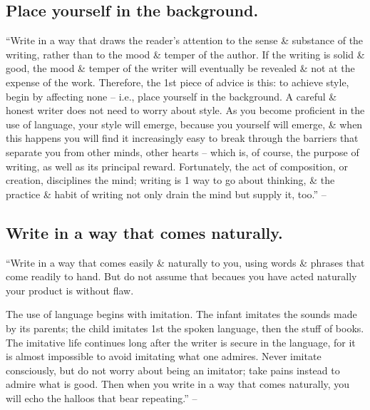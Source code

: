 \documentclass{article}
\numberwithin{equation}{section}
\begin{document}
\subsection{Place yourself in the background.}
``Write in a way that draws the reader's attention to the sense \& substance of the writing, rather than to the mood \& temper of the author. If the writing is solid \& good, the mood \& temper of the writer will eventually be revealed \& not at the expense of the work. Therefore, the 1st piece of advice is this: to achieve style, begin by affecting none -- i.e., place yourself in the background. A careful \& honest writer does not need to worry about style. As you become proficient in the use of language, your style will emerge, because you yourself will emerge, \& when this happens you will find it increasingly easy to break through the barriers that separate you from other minds, other hearts -- which is, of course, the purpose of writing, as well as its principal reward. Fortunately, the act of composition, or creation, disciplines the mind; writing is 1 way to go about thinking, \& the practice \& habit of writing not only drain the mind but supply it, too.'' -- \cite[p. 78]{Strunk_White2019}


\subsection{Write in a way that comes naturally.}
``Write in a way that comes easily \& naturally to you, using words \& phrases that come readily to hand. But do not assume that becaues you have acted naturally your product is without flaw.

The use of language begins with imitation. The infant imitates the sounds made by its parents; the child imitates 1st the spoken language, then the stuff of books. The imitative life continues long after the writer is secure in the language, for it is almost impossible to avoid imitating what one admires. Never imitate consciously, but do not worry about being an imitator; take pains instead to admire what is good. Then when you write in a way that comes naturally, you will echo the halloos that bear repeating.'' -- \cite[p. 79]{Strunk_White2019}

\end{document}
